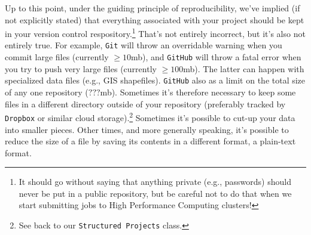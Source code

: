 \documentclass[12pt,letterpaper]{article}
\begin{document}
Up to this point, under the guiding principle of reproducibility, we've implied (if not explicitly stated) that everything associated with your project should be kept in your version control respository.\footnote{It should go without saying that anything private (e.g., passwords) should never be put in a public repository, but be careful not to do that when we start submitting jobs to High Performance Computing clusters!}
That's not entirely incorrect, but it's also not entirely true.
For example, \texttt{Git} will throw an overridable warning when you commit large files (currently $\ge 10$mb), and \texttt{GitHub} will throw a fatal error when you try to push very large files (currently $\ge 100$mb).
The latter can happen with specialized data files (e.g., GIS shapefiles).
\texttt{GitHub} also as a limit on the total size of any one repository ($???$mb).
Sometimes it's therefore necessary to keep some files in a different directory outside of your repository (preferably tracked by \texttt{Dropbox} or similar cloud storage).\footnote{See back to our \texttt{Structured Projects} class.}
Sometimes it's possible to cut-up your data into smaller pieces.
Other times, and more generally speaking, it's possible to reduce the size of a file by saving its contents in a different format, a plain-text format.
\end{document}

